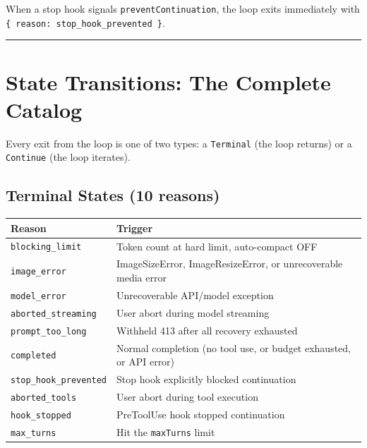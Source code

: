 \documentclass[
  english,
  11pt,
  letterpaper,
]{book}
\begin{document}
When a stop hook signals \texttt{preventContinuation}, the loop exits
immediately with
\texttt{\{\ reason:\ \textquotesingle{}stop\_hook\_prevented\textquotesingle{}\ \}}.

\begin{center}\rule{0.5\linewidth}{0.5pt}\end{center}

\section{State Transitions: The Complete
Catalog}\label{state-transitions-the-complete-catalog}

Every exit from the loop is one of two types: a \texttt{Terminal} (the
loop returns) or a \texttt{Continue} (the loop iterates).

\subsection{Terminal States (10
reasons)}\label{terminal-states-10-reasons}

\begin{longtable}[]{@{}
  >{\raggedright\arraybackslash}p{}
  >{\raggedright\arraybackslash}p{}@{}}
\toprule\noalign{}
\begin{minipage}[b]{\linewidth}\raggedright
Reason
\end{minipage} & \begin{minipage}[b]{\linewidth}\raggedright
Trigger
\end{minipage} \\
\midrule\noalign{}
\endhead
\bottomrule\noalign{}
\endlastfoot
\texttt{blocking\_limit} & Token count at hard limit, auto-compact
OFF \\
\texttt{image\_error} & ImageSizeError, ImageResizeError, or
unrecoverable media error \\
\texttt{model\_error} & Unrecoverable API/model exception \\
\texttt{aborted\_streaming} & User abort during model streaming \\
\texttt{prompt\_too\_long} & Withheld 413 after all recovery
exhausted \\
\texttt{completed} & Normal completion (no tool use, or budget
exhausted, or API error) \\
\texttt{stop\_hook\_prevented} & Stop hook explicitly blocked
continuation \\
\texttt{aborted\_tools} & User abort during tool execution \\
\texttt{hook\_stopped} & PreToolUse hook stopped continuation \\
\texttt{max\_turns} & Hit the \texttt{maxTurns} limit \\
\end{longtable}
\end{document}
